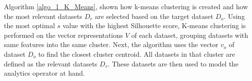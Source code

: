 Algorithm \ref{algo_1_K_Means}, shown how k-means clustering is created and how the most relevant datasets $D_r$ are selected based on the target dataset $D_o$. Using the most optimal $s$ value with the highest Silhouette score, K-means clustering is performed on the vector representations $V$ of each dataset, grouping datasets with same features into the same cluster. Next, the algorithm uses the vector $v_o$ of dataset $D_o$ to find the closest cluster centroid. All datasets in that cluster are defined as the relevant datasets $D_r$. These datasets are then used to model the analytics operator at hand.






